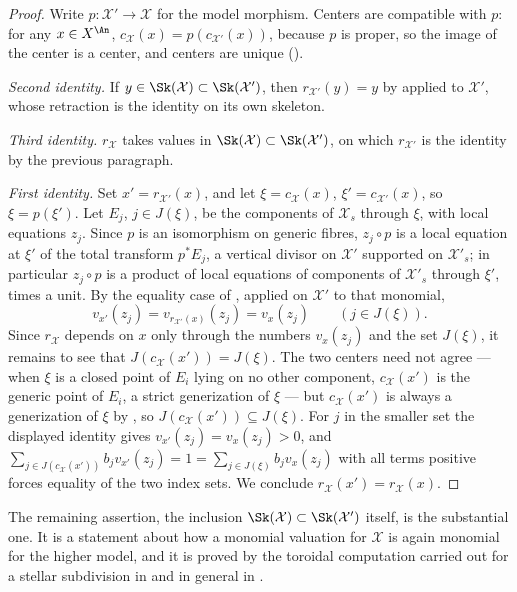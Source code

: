 \begin{proof}
Write $p:\mathcal X'\to\mathcal X$ for the model morphism. Centers are
compatible with $p$: for any $x\in X^{\An}$,
$c_{\mathcal X}(x)=p(c_{\mathcal X'}(x))$, because $p$ is proper, so
the image of the center is a center, and centers are unique
().

\emph{Second identity.} If $y\in\Sk(\mathcal X)\subset\Sk(\mathcal X')$,
then $r_{\mathcal X'}(y)=y$ by  applied to
$\mathcal X'$, whose retraction is the identity on its own skeleton.

\emph{Third identity.} $r_{\mathcal X}$ takes values in
$\Sk(\mathcal X)\subset\Sk(\mathcal X')$, on which $r_{\mathcal X'}$
is the identity by the previous paragraph.

\emph{First identity.} Set $x'=r_{\mathcal X'}(x)$, and let
$\xi=c_{\mathcal X}(x)$, $\xi'=c_{\mathcal X'}(x)$, so
$\xi=p(\xi')$. Let $E_j$, $j\in J(\xi)$, be the components of
$\mathcal X_s$ through $\xi$, with local equations $z_j$. Since
$p$ is an isomorphism on generic fibres, $z_j\circ p$ is a local
equation at $\xi'$ of the total transform $p^*E_j$, a vertical divisor
on $\mathcal X'$ supported on $\mathcal X'_s$; in particular $z_j\circ
p$ is a product of local equations of components of $\mathcal X'_s$
through $\xi'$, times a unit. By the equality case of
, applied on $\mathcal X'$ to that
monomial,
\[
 v_{x'}(z_j)=v_{r_{\mathcal X'}(x)}(z_j)=v_x(z_j)
 \qquad(j\in J(\xi)).
\]
Since $r_{\mathcal X}$ depends on $x$ only through the numbers
$v_x(z_j)$ and the set $J(\xi)$, it remains to see that
$J(c_{\mathcal X}(x'))=J(\xi)$.  The two centers need not agree --- when
$\xi$ is a closed point of $E_i$ lying on no other component,
$c_{\mathcal X}(x')$ is the generic point of $E_i$, a strict
generization of $\xi$ --- but $c_{\mathcal X}(x')$ is always a
generization of $\xi$ by , so
$J(c_{\mathcal X}(x'))\subseteq J(\xi)$.  For $j$ in the smaller set
the displayed identity gives $v_{x'}(z_j)=v_x(z_j)>0$, and
$\sum_{j\in J(c_{\mathcal X}(x'))}b_jv_{x'}(z_j)=1
 =\sum_{j\in J(\xi)}b_jv_x(z_j)$ with all terms positive forces equality
of the two index sets.  We conclude
$r_{\mathcal X}(x')=r_{\mathcal X}(x)$.
\end{proof}

The remaining assertion, the inclusion
$\Sk(\mathcal X)\subset\Sk(\mathcal X')$ itself, is the substantial one.
It is a statement about how a monomial valuation for $\mathcal X$ is
again monomial for the higher model, and it is proved by the toroidal
computation carried out for a stellar subdivision in
 and in general in
\cite[Proposition~3.6]{BFJ16}.

